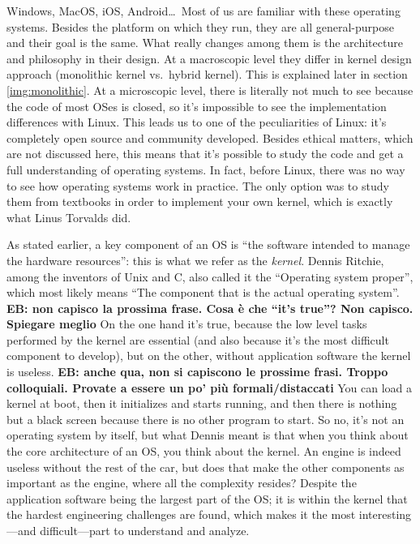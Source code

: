 \documentclass[10pt]{book}
\newcommand{\mycomment}[1]{\textbf{#1}}  %
\begin{document}
Windows, MacOS, iOS, Android\dots\   Most of us are familiar with these operating systems. Besides the platform on which they run, they are all general-purpose and their goal is the same. What really changes among them is the architecture and philosophy in their design. At a macroscopic level they differ in kernel design approach (monolithic kernel vs.\ hybrid kernel). This is explained later in section \ref{img:monolithic}. At a microscopic level, there is literally not much to see because the code of most OSes is closed, so it's impossible to see the implementation differences with Linux. This leads us to one of the peculiarities of Linux: it's completely open source and community developed. Besides ethical matters, which are not discussed here, this means that it's possible to study the code and get a full understanding of operating systems. In fact, before Linux, there was no way to see how operating systems work in practice. The only option was to study them from textbooks in order to implement your own kernel, which is exactly what Linus Torvalds did.

As stated earlier, a key component of an OS is ``the software intended to manage the hardware resources'': this is what we refer as the \textit{kernel}. Dennis Ritchie, among the inventors of Unix and C, also called it the ``Operating system proper''\cite{ritchie}, which most likely means ``The component that is the actual operating system''. \mycomment{EB: non capisco la prossima frase. Cosa \`e che ``it's true''? Non capisco. Spiegare meglio} On the one hand it's true, because the low level tasks performed by the kernel are essential (and also because it's the most difficult component to develop), but on the other, without application software the kernel is useless. \mycomment{EB: anche qua, non si capiscono le prossime frasi. Troppo colloquiali. Provate a essere un po' pi\`u formali/distaccati} You can load a kernel at boot, then it initializes and starts running, and then there is nothing but a black screen because there is no other program to start. So no, it's not an operating system by itself, but what Dennis meant is that when you think about the core architecture of an OS, you think about the kernel. An engine is indeed useless without the rest of the car, but does that make the other components as important as the engine, where all the complexity resides? Despite the application software being the largest part of the OS; it is within the kernel that the hardest engineering challenges are found, which makes it the most interesting---and difficult---part to understand and analyze.
\end{document}
